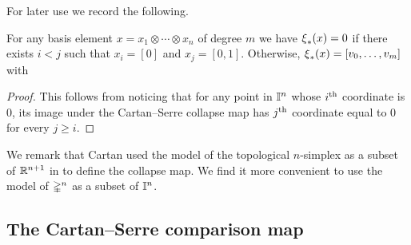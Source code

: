 For later use we record the following.
\begin{lemma} \label{l:kernel of psi}
	For any basis element $x = x_1 \otimes \cdots \otimes x_n$ of degree $m$ we have $\operatorname{\xi}_\ast(x) = 0$ if there exists $i < j$ such that $x_i = [0]$ and $x_j = [0,1]$.
	Otherwise, $\operatorname{\xi}_\ast(x) = [v_0, \dots, v_m]$ with
\end{lemma}

\begin{proof}
	This follows from noticing that for any point in $\mathbb{I}^n$ whose $i^{\mathrm{th}}$ coordinate is $0$, its image under the Cartan--Serre collapse map has $j^{\mathrm{th}}$ coordinate equal to $0$ for every $j \geq i$.
\end{proof}

We remark that Cartan used the model of the topological $n$-simplex as a subset of $\mathbb{R}^{n+1}$ in \cite[p. 442]{serre1951homologie} to define the collapse map.
We find it more convenient to use the model of $\mathbb{\Delta}^n$ as a subset of $\mathbb{I}^n$.


%
%
%

\subsection{The Cartan--Serre comparison map} \label{ss:comparison map}

